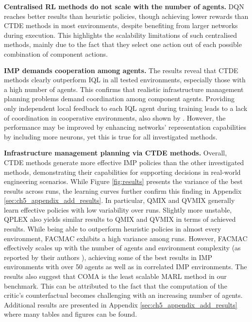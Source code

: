 \textbf{Centralised RL methods do not scale with the number of agents.}
DQN reaches better results than heuristic policies, though achieving lower rewards than CTDE methods in most environments, despite benefiting from larger networks during execution.
This highlights the scalability limitations of such centralised methods, mainly due to the fact that they select one action out of each possible combination of component actions.

\textbf{IMP demands cooperation among agents.}
The results reveal that CTDE methods clearly outperform IQL in all tested environments, especially those with a high number of agents.
This confirms that realistic infrastructure management planning problems demand coordination among component agents.
Providing only independent local feedback to each IQL agent during training leads to a lack of coordination in cooperative environments, also shown by \cite{Rashid2018}. 
However, the performance may be improved by enhancing networks' representation capabilities by including more neurons, yet this is true for all investigated methods.

\textbf{Infrastructure management planning via CTDE methods.}
Overall, CTDE methods generate more effective IMP policies than the other investigated methods, demonstrating their capabilities for supporting decisions in real-world engineering scenarios.
While Figure \ref{fig:results} presents the variance of the best results across runs, the learning curves further confirm this finding in Appendix \ref{sec:ch5_appendix_add_results}.
In particular, QMIX and QVMIX generally learn effective policies with low variability over runs. 
Slightly more unstable, QPLEX also yields similar results to QMIX and QVMIX in terms of achieved results.
While being able to outperform heuristic policies in almost every environment, FACMAC exhibits a high variance among runs.
However, FACMAC effectively scales up with the number of agents and environment complexity (as reported by their authors \citep{peng2021facmac}), achieving some of the best results in IMP environments with over 50 agents as well as in correlated IMP environments.
The results also suggest that COMA is the least scalable MARL method in our benchmark.
This can be attributed to the fact that the computation of the critic's counterfactual becomes challenging with an increasing number of agents.
Additional results are presented in Appendix \ref{sec:ch5_appendix_add_results} where many tables and figures can be found.  

